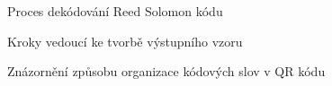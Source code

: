 \begin{figure}[H]
  \begin{center}
    \caption{Proces dekódování Reed Solomon kódu}
    \label{ReedSolomonDecodingProcess}
  \end{center}
\end{figure}

\begin{figure}[H]
  \begin{center}
    \caption{Kroky vedoucí ke tvorbě výstupního vzoru}
    \label{CreatingOutputPatternProcess}
  \end{center}
\end{figure}

\begin{figure}[H]
  \begin{center}
    \caption{Znázornění způsobu organizace kódových slov v QR kódu}
    \label{PuttingDataCodewordsIntoQRCode}
  \end{center}
\end{figure}

